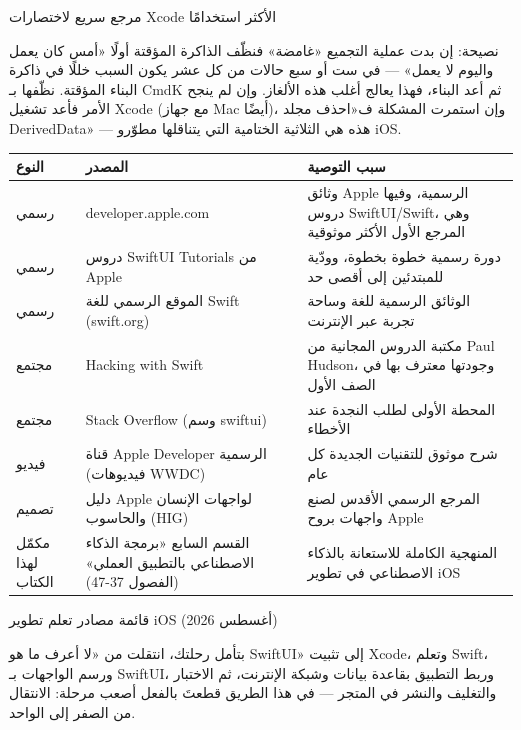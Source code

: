 \begin{center}\small\color{gray}مرجع سريع لاختصارات Xcode الأكثر استخدامًا\end{center}

\begin{tcbinfo}{نصيحة: إن بدت عملية التجميع «غامضة» فنظّف الذاكرة المؤقتة أولًا}
«أمس كان يعمل واليوم لا يعمل» — في ست أو سبع حالات من كل عشر يكون السبب خللًا في ذاكرة البناء المؤقتة. نظّفها بـ CmdK ثم أعد البناء، فهذا يعالج أغلب هذه الألغاز. وإن لم ينجح الأمر فأعد تشغيل Xcode (مع جهاز Mac أيضًا)، وإن استمرت المشكلة ف«احذف مجلد DerivedData» — هذه هي الثلاثية الختامية التي يتناقلها مطوّرو iOS.

\end{tcbinfo}



\begin{center}
\begin{tabularx}{\linewidth}{|X|X|X|}
\hline
\textbf{النوع} & \textbf{المصدر} & \textbf{سبب التوصية} \tabularnewline
\hline
رسمي & developer.apple.com & وثائق Apple الرسمية، وفيها دروس SwiftUI/Swift، وهي المرجع الأول الأكثر موثوقية \tabularnewline
رسمي & دروس SwiftUI Tutorials من Apple & دورة رسمية خطوة بخطوة، وودّية للمبتدئين إلى أقصى حد \tabularnewline
رسمي & الموقع الرسمي للغة Swift (swift.org) & الوثائق الرسمية للغة وساحة تجربة عبر الإنترنت \tabularnewline
مجتمع & Hacking with Swift & مكتبة الدروس المجانية من Paul Hudson، وجودتها معترف بها في الصف الأول \tabularnewline
مجتمع & Stack Overflow (وسم swiftui) & المحطة الأولى لطلب النجدة عند الأخطاء \tabularnewline
فيديو & قناة Apple Developer الرسمية (فيديوهات WWDC) & شرح موثوق للتقنيات الجديدة كل عام \tabularnewline
تصميم & دليل Apple لواجهات الإنسان والحاسوب (HIG) & المرجع الرسمي الأقدس لصنع واجهات بروح Apple \tabularnewline
مكمّل لهذا الكتاب & القسم السابع «برمجة الذكاء الاصطناعي بالتطبيق العملي» (الفصول 37-47) & المنهجية الكاملة للاستعانة بالذكاء الاصطناعي في تطوير iOS \tabularnewline
\hline
\end{tabularx}
\end{center}

\begin{center}\small\color{gray}قائمة مصادر تعلم تطوير iOS (أغسطس 2026)\end{center}


بتأمل رحلتك، انتقلت من «لا أعرف ما هو SwiftUI» إلى تثبيت Xcode، وتعلم Swift، ورسم الواجهات بـ SwiftUI، وربط التطبيق بقاعدة بيانات وشبكة الإنترنت، ثم الاختبار والتغليف والنشر في المتجر — في هذا الطريق قطعتَ بالفعل أصعب مرحلة: الانتقال من الصفر إلى الواحد.

